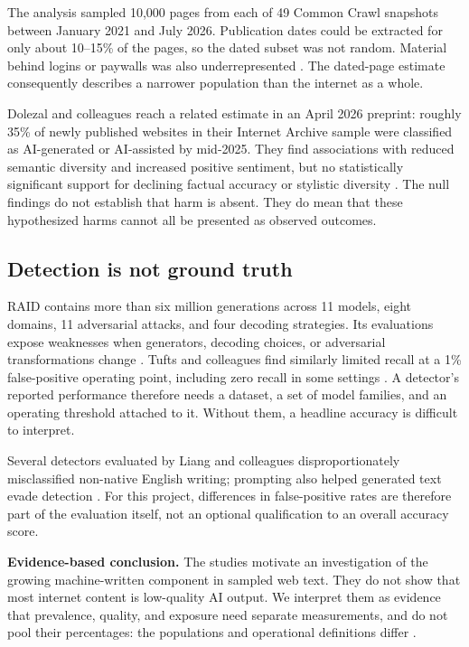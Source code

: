 \documentclass[11pt]{article}
\begin{document}
The analysis sampled 10,000 pages from each of 49 Common Crawl snapshots
between January 2021 and July 2026. Publication dates could be extracted for
only about 10--15\% of the pages, so the dated subset was not random. Material
behind logins or paywalls was also underrepresented \cite{pewmethods}. The
dated-page estimate consequently describes a narrower population than the
internet as a whole.

Dolezal and colleagues reach a related estimate in an April 2026 preprint:
roughly 35\% of newly published websites in their Internet Archive sample were
classified as AI-generated or AI-assisted by mid-2025. They find associations
with reduced semantic diversity and increased positive sentiment, but no
statistically significant support for declining factual accuracy or stylistic
diversity \cite{dolezal}. The null findings do not establish that harm is
absent. They do mean that these hypothesized harms cannot all be presented
as observed outcomes.

\subsection{Detection is not ground truth}
RAID contains more than six million generations across 11 models, eight
domains, 11 adversarial attacks, and four decoding strategies. Its evaluations
expose weaknesses when generators, decoding choices, or adversarial
transformations change \cite{raid}. Tufts and colleagues find similarly
limited recall at a 1\% false-positive operating point, including zero recall
in some settings \cite{tufts}. A detector's reported performance therefore
needs a dataset, a set of model families, and an operating threshold attached
to it. Without them, a headline accuracy is difficult to interpret.

Several detectors evaluated by Liang and colleagues disproportionately
misclassified non-native English writing; prompting also helped generated
text evade detection \cite{liang}. For this project, differences in
false-positive rates are therefore part of the evaluation itself, not an
optional qualification to an overall accuracy score.

\textbf{Evidence-based conclusion.} The studies motivate an investigation of
the growing machine-written component in sampled web text. They do not show
that most internet content is low-quality AI output. We interpret them as
evidence that prevalence, quality, and exposure need separate measurements,
and do not pool their percentages: the populations and operational definitions
differ \cite{pew,pewmethods,dolezal}.
\end{document}
